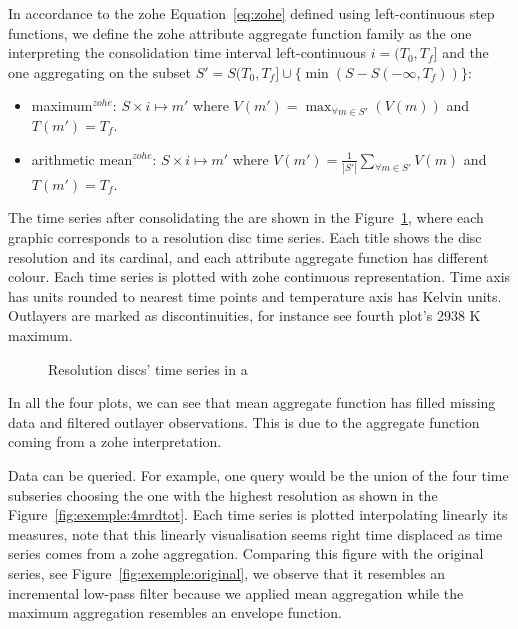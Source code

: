 In accordance to the zohe Equation~\ref{eq:zohe} defined using
left-continuous step functions, we define the zohe attribute aggregate
function family as the one interpreting the consolidation time
interval left-continuous $i=(T_0,T_f]$ and the one aggregating on the
subset $S'=S(T_0,T_f] \cup \{\min(S-S(-\infty,T_f))\}$:
\begin{itemize}
  \renewcommand{\labelitemi}{--}
\item maximum$^{zohe}$: $S \times i \mapsto m'$ where $V(m') =
  \max_{\forall m \in S'}(V(m))$ and $T(m')=T_f$.
\item arithmetic mean$^{zohe}$: $S \times i \mapsto m'$ where $V(m')
  = \frac{1}{|S'|} \sum\limits_{\forall m\in S'} V(m)$ and
  $T(m')=T_f$. 
\end{itemize}


The time series after consolidating the  are shown in the
Figure~\ref{fig:exemple:4mrd}, where each graphic corresponds to a
resolution disc time series. Each title shows the disc resolution and
its cardinal, and each attribute aggregate function has different
colour.  Each time series is plotted with zohe continuous
representation. Time axis has  units rounded to nearest time
points and temperature axis has Kelvin units. Outlayers are marked as
discontinuities, for instance see fourth plot's 2938 K maximum.

\begin{figure}[tp]
  \centering
  
  \caption{Resolution discs' time series in a }
  \label{fig:exemple:4mrd}
\end{figure}

In all the four plots, we can see that mean aggregate function has
filled missing data and filtered outlayer observations. This is due
to the aggregate function coming from a zohe interpretation.

Data can be queried.  For example, one query would be the union of the
four time subseries choosing the one with the highest resolution as
shown in the Figure~\ref{fig:exemple:4mrdtot}.  Each time series is
plotted interpolating linearly its measures, note that this linearly
visualisation seems right time displaced as time series comes from a
zohe aggregation.  Comparing this figure with the original series, see
Figure~\ref{fig:exemple:original}, we observe that it resembles an
incremental low-pass filter because we applied mean aggregation while
the maximum aggregation resembles an envelope function.

